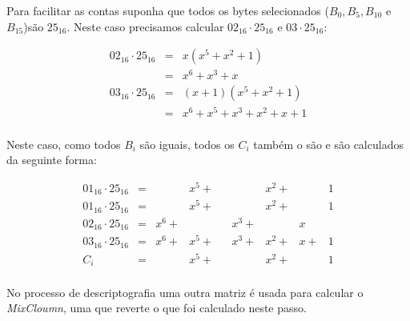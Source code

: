 Para facilitar as contas suponha que todos os bytes selecionados ($B_0, B_5, B_{10}$ e $B_{15}$)são $25_{16}$.
Neste caso precisamos calcular $02_{16} \cdot 25_{16}$ e $03 \cdot 25_{16}$:


\begin{eqnarray*}
  02_{16} \cdot 25_{16} & = & x(x^5 + x^2 + 1)\\
                      & = & x^6 + x^3 + x\\
  03_{16} \cdot 25_{16} & = & (x + 1)(x^5 + x^2 + 1)\\ 
                      & = & x^6 + x^5 + x^3 + x^2 + x + 1\\ 
\end{eqnarray*}

Neste caso, como todos $B_i$ são iguais, todos os $C_i$ também o são e são calculados da seguinte forma:

\begin{displaymath}
  \begin{array}{cccccccccc}
    01_{16} \cdot 25_{16} & = & & x^5 + & & & x^2 + & & 1\\
    01_{16} \cdot 25_{16} & = & & x^5 + & & & x^2 + & & 1\\
    02_{16} \cdot 25_{16} & = & x^6 + & & & x^3 + & & x & \\
    03_{16} \cdot 25_{16} & = & x^6 + & x^5 + & & x^3 + & x^2 + & x + & 1\\
    \hline
    C_i & = & & x^5 + & & & x^2 + &  & 1\\
  \end{array}
\end{displaymath}

No processo de descriptografia uma outra matriz é usada para calcular o {\em MixCloumn}, uma que reverte o que foi calculado neste passo.